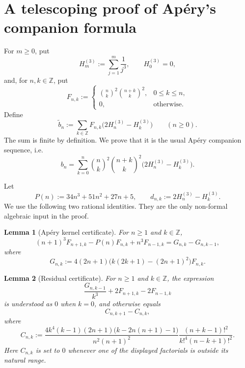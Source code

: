 \documentclass[11pt]{article}
\newcommand{\Hthree}[1]{H_{#1}^{(3)}}
\newcommand{\Kern}{F}
\newcommand{\Ppoly}{P}
\newtheorem{lemma}{Lemma}
\begin{document}
\section*{A telescoping proof of Apéry's companion formula}

For $m\geq 0$, put
\[
  \Hthree m:=\sum_{j=1}^{m}\frac1{j^3},\qquad \Hthree0=0,
\]
and, for $n,k\in\mathbb Z$, put
\[
 \Kern_{n,k}:=
 \begin{cases}
 \displaystyle\binom nk^2\binom{n+k}{k}^2,&0\leq k\leq n,\\[1ex]
 0,&\text{otherwise}.
 \end{cases}
\]
Define
\[
 \widetilde b_n:=\sum_{k\in\mathbb Z}\Kern_{n,k}
       \bigl(2\Hthree n-\Hthree k\bigr)\qquad(n\geq0).
\]
The sum is finite by definition.  We prove that it is the usual Apéry
companion sequence, i.e.
\[
 \boxed{\quad b_n=\sum_{k=0}^n\binom nk^2\binom{n+k}{k}^2
       \bigl(2H_n^{(3)}-H_k^{(3)}\bigr).\quad}                 \tag{A}\label{eq:A}
\]

Let
\[
 \Ppoly(n):=34n^3+51n^2+27n+5,
 \qquad
 d_{n,k}:=2\Hthree n-\Hthree k.
\]
We use the following two rational identities.  They are the only
non-formal algebraic input in the proof.

\begin{lemma}[Apéry kernel certificate]\label{lem:kernel}
For $n\geq1$ and $k\in\mathbb Z$,
\[
 (n+1)^3\Kern_{n+1,k}-\Ppoly(n)\Kern_{n,k}+n^3\Kern_{n-1,k}
 =G_{n,k}-G_{n,k-1},                                          \tag{B}\label{eq:B}
\]
where
\[
 G_{n,k}:=4(2n+1)\bigl(k(2k+1)-(2n+1)^2\bigr)\Kern_{n,k}.
\]
\end{lemma}

\begin{lemma}[Residual certificate]\label{lem:residual}
For $n\geq1$ and $k\in\mathbb Z$, the expression
\[
 \frac{G_{n,k-1}}{k^3}+2\Kern_{n+1,k}-2\Kern_{n-1,k}          \tag{C}
\]
is understood as $0$ when $k=0$, and otherwise equals
\[
 C_{n,k+1}-C_{n,k},                                           \tag{D}
\]
where
\[
 C_{n,k}:=
 \frac{4k^4(k-1)(2n+1)\bigl(k-2n(n+1)-1\bigr)}{n^2(n+1)^2}
 \frac{(n+k-1)!^2}{k!^4(n-k+1)!^2}.
\]
Here $C_{n,k}$ is set to $0$ whenever one of the displayed factorials
is outside its natural range.
\end{lemma}
\end{document}
